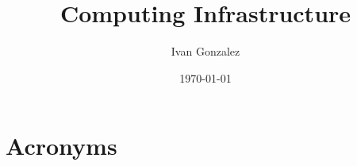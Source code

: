 \documentclass[PMO,authoryear,toc]{lsstdoc}
\title{Computing Infrastructure}
\author{%
Ivan Gonzalez
}
\date{\today}
\begin{document}
\maketitle





\newpage
\appendix
%

\section{Acronyms} \label{sec:acronyms}

\end{document}
